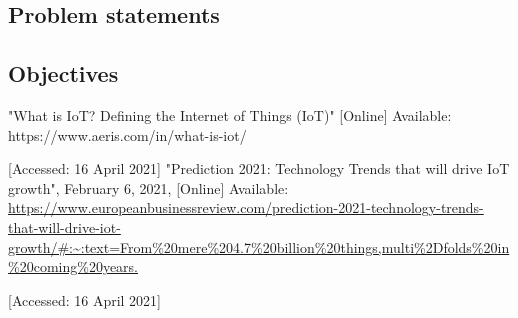 \documentclass[conference]{IEEEtran}
\begin{document}
\subsection{Problem statements}

\subsection{Objectives}


\begin{thebibliography}{00}
 "What is IoT? Defining the Internet of Things (IoT)" [Online] Available: https://www.aeris.com/in/what-is-iot/

[Accessed: 16 April 2021]
 "Prediction 2021: Technology Trends that will drive IoT growth", February 6, 2021, [Online] Available: \url{https://www.europeanbusinessreview.com/prediction-2021-technology-trends-that-will-drive-iot-growth/#:~:text=From%20mere%204.7%20billion%20things,multi%2Dfolds%20in%20coming%20years.}

[Accessed: 16 April 2021]

\end{thebibliography}
\vspace{12pt}
\end{document}
